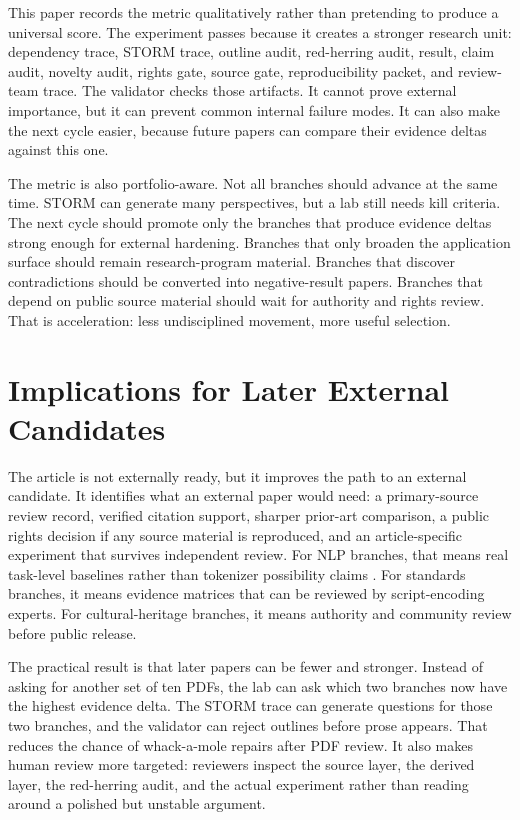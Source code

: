 \documentclass[sigconf,nonacm]{acmart}
\begin{document}
This paper records the metric qualitatively rather than pretending to produce a
universal score. The experiment passes because it creates a stronger research
unit: dependency trace, STORM trace, outline audit, red-herring audit, result,
claim audit, novelty audit, rights gate, source gate, reproducibility packet,
and review-team trace. The validator checks those artifacts. It cannot prove
external importance, but it can prevent common internal failure modes. It can
also make the next cycle easier, because future papers can compare their
evidence deltas against this one.

The metric is also portfolio-aware. Not all branches should advance at the same
time. STORM can generate many perspectives, but a lab still needs kill criteria.
The next cycle should promote only the branches that produce evidence deltas
strong enough for external hardening. Branches that only broaden the application
surface should remain research-program material. Branches that discover
contradictions should be converted into negative-result papers. Branches that
depend on public source material should wait for authority and rights review.
That is acceleration: less undisciplined movement, more useful selection.

\section{Implications for Later External Candidates}
The article is not externally ready, but it improves the path to an external
candidate. It identifies what an external paper would need: a primary-source
review record, verified citation support, sharper prior-art comparison, a public
rights decision if any source material is reproduced, and an article-specific
experiment that survives independent review. For NLP branches, that means real
task-level baselines rather than tokenizer possibility claims \cite{wadden2020scifact,gao2023alce,sennrich2016bpe,kudo2018sentencepiece,bostrom2020bytepair,rust2021tokenization}.
For standards branches, it means evidence matrices that can be reviewed by
script-encoding experts. For cultural-heritage branches, it means authority and
community review before public release.

The practical result is that later papers can be fewer and stronger. Instead of
asking for another set of ten PDFs, the lab can ask which two branches now have
the highest evidence delta. The STORM trace can generate questions for those two
branches, and the validator can reject outlines before prose appears. That
reduces the chance of whack-a-mole repairs after PDF review. It also makes
human review more targeted: reviewers inspect the source layer, the derived
layer, the red-herring audit, and the actual experiment rather than reading
around a polished but unstable argument.
\end{document}
